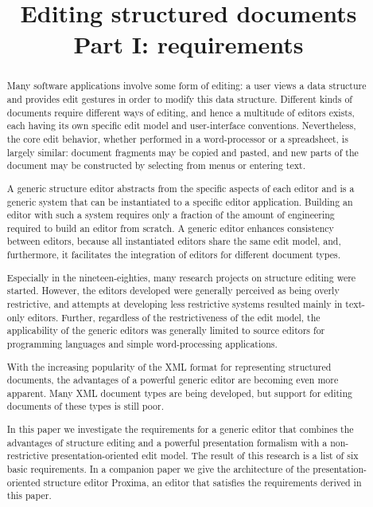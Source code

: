 \documentclass{speauth}
\begin{document}


  \title{Editing structured documents\\ Part I: requirements \\{\small \version}} 
  \address{Institute of Information and Computing Sciences\\ Utrecht University\\
    Utrecht, The Netherlands}     

\begin{abstract} 
Many software applications involve some form of editing: a user views a data structure and provides edit gestures in order to modify this data structure. Different kinds of documents require different ways of editing, and hence a multitude of editors exists, each having its own specific edit model and user-interface conventions. Nevertheless, the core edit behavior, whether performed in a word-processor or a spreadsheet, is largely similar: document fragments may be copied and pasted, and new parts of the document may be constructed by selecting from menus or entering text. 

A generic structure editor abstracts from the specific aspects of each editor and is a generic system that can be instantiated to a specific editor application. Building an editor with such a system requires only a fraction of the amount of engineering required to build an editor from scratch. 
A generic editor enhances consistency between editors, because all instantiated editors share the same edit model, and, furthermore, it facilitates the integration of editors for different document types.

Especially in the nineteen-eighties, many research projects on structure editing were started. However, the editors developed were generally perceived as being overly restrictive, and attempts at developing less restrictive systems resulted mainly in text-only editors. Further, regardless of the restrictiveness of the edit model, the applicability of the generic editors was generally limited to source editors for programming languages and simple word-processing applications.

With the increasing popularity of the XML format for representing structured documents, the advantages of a powerful generic editor are becoming even more apparent. Many XML document types are being developed, but support for editing documents of these types is still poor. 

In this paper we investigate the requirements for a generic editor that combines the advantages of structure editing and a powerful presentation formalism with a non-restrictive presentation-oriented edit model. The result of this research is a list of six basic requirements. In a companion paper \cite{proximaarch} we give the architecture of the presentation-oriented structure editor Proxima, an editor that satisfies  the requirements derived in this paper.
\end{abstract}
\end{document}
